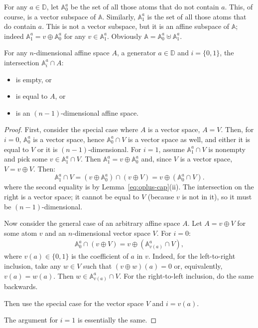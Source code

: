 \documentclass[10pt,a4paper]{amsart}
\numberwithin{equation}{section}
\newcommand{\D}{{\mathbb D}}
\newcommand{\atoms}{\mathbb A}
\begin{document}
For any $a\in\D$, let $\atoms^a_0$ be the set of all those atoms that do not contain $a$. This, of course, is a vector subspace of $\atoms$. Similarly, $\atoms^a_1$ is the set of all those atoms that do contain $a$. This is not a vector subspace, but it is an affine subspace of $\atoms$; indeed $\atoms^a_1=v\oplus\atoms^a_0$ for any $v\in\atoms^a_1$. Obviously $\atoms=\atoms^a_0\uplus\atoms^a_1$.

\begin{lemma}\label{lem:vvcapaff}
For any $n$-dimensional affine space $A$, a generator $a\in\D$ and $i=\{0,1\}$, the intersection $\atoms^a_i\cap A$:
\begin{itemize}
\item is empty, or
\item is equal to $A$, or
\item is an $(n-1)$-dimensional affine space.
\end{itemize}
\end{lemma}
\begin{proof}
First, consider the special case where $A$ is a vector space, $A=V$. Then, for $i=0$, $\atoms^a_0$ is a vector space, hence $\atoms^a_0\cap V$ is a vector space as well, and either it is equal to $V$ or it is $(n-1)$-dimensional. For $i=1$, assume $\atoms^a_1\cap V$ is nonempty and pick some $v\in \atoms^a_1\cap V$. Then $\atoms^a_1=v\oplus\atoms^a_0$ and, since $V$ is a vector space, $V=v\oplus V$. Then:
\[
	\atoms^a_1\cap V = (v\oplus\atoms^a_0)\cap (v\oplus V) =
	v\oplus(\atoms^a_0\cap V).
\]
where the second equality is by Lemma~\ref{eq:oplus-cap}(ii).
The intersection on the right is a vector space; it cannot be equal to $V$ (because $v$ is not in it), so it must be $(n-1)$-dimensional.

Now consider the general case of an arbitrary affine space $A$. Let $A=v\oplus V$ for some atom $v$ and an $n$-dimensional vector space $V$. For $i=0$:
\begin{align*}\label{eq:capoplus}
	\atoms^a_0\cap (v\oplus V) = v\oplus(\atoms^a_{v(a)}\cap V),
\end{align*}
where $v(a)\in\{0,1\}$ is the coefficient of $a$ in $v$.
Indeed, for the left-to-right inclusion, take any $w\in V$ such that $(v\oplus w)(a)=0$ or, equivalently, $v(a)=w(a)$. Then $w\in\atoms^a_{v(a)}\cap V$. For the right-to-left inclusion, do the same backwards.

Then use the special case for the vector space $V$ and $i=v(a)$.

The argument for $i=1$ is essentially the same.
\end{proof}
\end{document}
